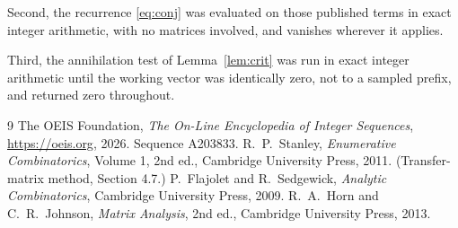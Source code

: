 \documentclass[11pt,a4paper]{article}
\theoremstyle{plain}
\theoremstyle{definition}
\begin{document}
Second, the recurrence \eqref{eq:conj} was evaluated on those published terms in exact
integer arithmetic, with no matrices involved, and vanishes wherever it applies.

Third, the annihilation test of Lemma~\ref{lem:crit} was run in exact integer arithmetic
until the working vector was identically zero, not to a sampled prefix, and returned zero
throughout.

\begin{thebibliography}{9}
 The OEIS Foundation, \emph{The On-Line Encyclopedia of Integer
Sequences}, \url{https://oeis.org}, 2026. Sequence A203833.
 R.~P.~Stanley, \emph{Enumerative Combinatorics}, Volume 1, 2nd ed.,
Cambridge University Press, 2011. (Transfer-matrix method, Section 4.7.)
 P.~Flajolet and R.~Sedgewick, \emph{Analytic Combinatorics}, Cambridge
University Press, 2009.
 R.~A.~Horn and C.~R.~Johnson, \emph{Matrix Analysis}, 2nd ed., Cambridge
University Press, 2013.
\end{thebibliography}
\end{document}
